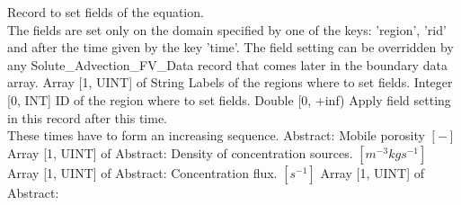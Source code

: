 \begin{RecordType}
	{}
	{} %
	{} %
	{} %
	{{{Record to set fields of the equation.}\\{
The fields are set only on the domain specified by one of the keys: 'region', 'rid'}\\{
and after the time given by the key 'time'. The field setting can be overridden by}\\{
 any Solute{\_}Advection{\_}FV{\_}Data record that comes later in the boundary data array.}}}
		\KeyItem
			{}
			{{Array [1, UINT] of }{String}}
			{\textrangle}
			{} %
			{{{Labels of the regions where to set fields. }}}
		\KeyItem
			{}
			{{Integer [0, INT]}}
			{\textrangle}
			{} %
			{{{ID of the region where to set fields.}}}
		\KeyItem
			{}
			{{Double [0, +inf)}}
			{\textrangle}
			{} %
			{{{Apply field setting in this record after this time.}\\{
These times have to form an increasing sequence.}}}
		\KeyItem
			{}
			{{Abstract}{: }}
			{\textrangle}
			{} %
			{{{Mobile porosity }{$[-]$}}}
		\KeyItem
			{}
			{{Array [1, UINT] of }{Abstract}{: }}
			{\textrangle}
			{} %
			{{{Density of concentration sources. }{$[m^{-3}kgs^{-1}]$}}}
		\KeyItem
			{}
			{{Array [1, UINT] of }{Abstract}{: }}
			{\textrangle}
			{} %
			{{{Concentration flux. }{$[s^{-1}]$}}}
		\KeyItem
			{}
			{{Array [1, UINT] of }{Abstract}{: }}
			{\textrangle}

\end{RecordType}
